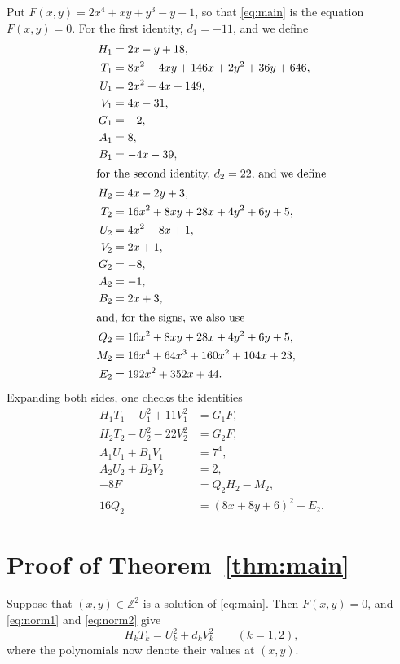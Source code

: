 \documentclass[11pt]{article}
\newcommand{\Z}{\mathbb{Z}}
\begin{document}
Put $F(x,y)=2x^{4}+xy+y^{3}-y+1$, so that \eqref{eq:main} is the equation $F(x,y)=0$.
For the first identity, $d_{1}=-11$, and we define
\begin{align*}
H_{1}&=2x-y+18,\\
T_{1}&=8x^{2}+4xy+146x+2y^{2}+36y+646,\\
U_{1}&=2x^{2}+4x+149,\\
V_{1}&=4x-31,\\
G_{1}&=-2,\\
A_{1}&=8,\\
B_{1}&=-4x-39,\\
\intertext{for the second identity, $d_{2}=22$, and we define}
H_{2}&=4x-2y+3,\\
T_{2}&=16x^{2}+8xy+28x+4y^{2}+6y+5,\\
U_{2}&=4x^{2}+8x+1,\\
V_{2}&=2x+1,\\
G_{2}&=-8,\\
A_{2}&=-1,\\
B_{2}&=2x+3,\\
\intertext{and, for the signs, we also use}
Q_{2}&=16x^{2}+8xy+28x+4y^{2}+6y+5,\\
M_{2}&=16x^{4}+64x^{3}+160x^{2}+104x+23,\\
E_{2}&=192x^{2}+352x+44.
\end{align*}
Expanding both sides, one checks the identities
\begin{align}
H_{1}T_{1}-U_{1}^2+11V_{1}^2&=G_{1}F,\label{eq:norm1}\\
H_{2}T_{2}-U_{2}^2-22V_{2}^2&=G_{2}F,\label{eq:norm2}\\
A_{1}U_{1}+B_{1}V_{1}&=7^{4},\label{eq:bez1}\\
A_{2}U_{2}+B_{2}V_{2}&=2,\label{eq:bez2}\\
-8F&=Q_{2}H_{2}-M_{2},\label{eq:sign2}\\
16Q_{2}&=(8x+8y+6)^2+E_{2}.\label{eq:sign2b}
\end{align}

\section{Proof of Theorem~\ref{thm:main}}

Suppose that $(x,y)\in\Z^2$ is a solution of \eqref{eq:main}. Then $F(x,y)=0$, and \eqref{eq:norm1} and \eqref{eq:norm2} give
\begin{equation}\label{eq:HT}
H_kT_k=U_k^2+d_kV_k^2\qquad(k=1,2),
\end{equation}
where the polynomials now denote their values at $(x,y)$.
\end{document}
